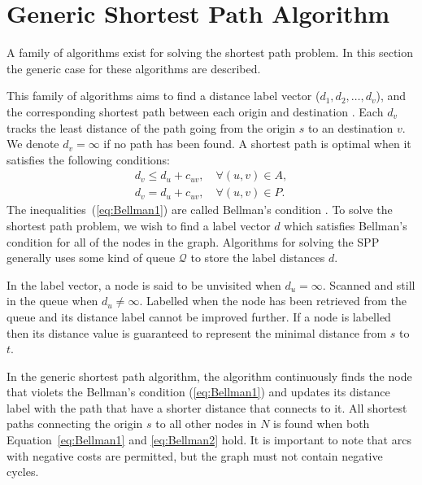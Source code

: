 \begin{comment}
Through out the report,
run-time analysis (big O and other notations) is used to demonstrate the estimation of algorithm running time regarding their input size. 
\todo[inline]{How do I nicely say `let the reader refer to other resources?'
or do I describe what big O notation is?}
\end{comment}

\section{Generic Shortest Path Algorithm}
A family of algorithms exist for solving the shortest path problem.
In this section the generic case for these algorithms are described.

This family of algorithms aims to find a 
distance label vector ($d_1, d_2,\dots, d_v$),
and the corresponding shortest path between each origin and destination \citep{Klunder}.
Each $d_v$ tracks the least distance of the path going from the origin $s$ to an destination $v$.
We denote $d_v = \infty$ if no path has been found.
A shortest path is optimal when it satisfies the following conditions:
\begin{align}
    d_v \leq d_u + c_{uv}, \quad \forall(u,v) \in A, \label{eq:Bellman1}\\
    d_v  =   d_u + c_{uv}, \quad \forall(u,v) \in P. \label{eq:Bellman2}
\end{align}
The inequalities~(\ref{eq:Bellman1}) are called Bellman's condition \citep{Bellman}.
To solve the shortest path problem,
we wish to find a label vector $d$ which satisfies Bellman's condition for all of the nodes in the graph.
Algorithms for solving the SPP generally uses some kind of queue $\mathcal{Q}$ to store the label distances $d$.

In the label vector,
a node is said to be unvisited when $d_u = \infty$.
Scanned and still in the queue when $d_u \neq \infty$.
Labelled when the node has been retrieved from the queue and its distance label cannot be improved further.
If a node is labelled then its distance value is guaranteed to represent the minimal distance from $s$ to $t$.

In the generic shortest path algorithm,
the algorithm continuously finds the node that violets the Bellman's condition (\ref{eq:Bellman1}) and updates its distance label with the path that have a shorter distance that connects to it.
All shortest paths connecting the origin $s$ to all other nodes in $N$ is found when both Equation~\ref{eq:Bellman1} and \ref{eq:Bellman2} hold.
It is important to note that arcs with negative costs are permitted,
but the graph must not contain negative cycles.

